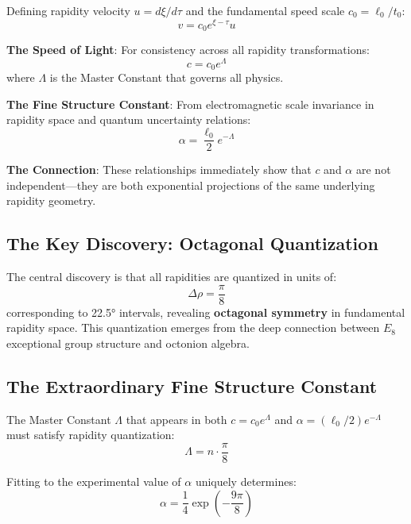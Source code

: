 \documentclass[12pt,a4paper]{article}
\begin{document}
Defining rapidity velocity $u = d\xi/d\tau$ and the fundamental speed scale $c_0 = \ell_0/t_0$:
\begin{equation}
v = c_0 e^{\xi-\tau} u
\end{equation}

\textbf{The Speed of Light}: For consistency across all rapidity transformations:
\begin{equation}
c = c_0 e^{\Lambda}
\end{equation}
where $\Lambda$ is the Master Constant that governs all physics.

\textbf{The Fine Structure Constant}: From electromagnetic scale invariance in rapidity space and quantum uncertainty relations:
\begin{equation}
\alpha = \frac{\ell_0}{2} e^{-\Lambda}
\end{equation}

\textbf{The Connection}: These relationships immediately show that $c$ and $\alpha$ are not independent—they are both exponential projections of the same underlying rapidity geometry.

\subsection{The Key Discovery: Octagonal Quantization}

The central discovery is that all rapidities are quantized in units of:
\begin{equation}
\boxed{\Delta\rho = \frac{\pi}{8}}
\end{equation}
corresponding to 22.5° intervals, revealing \textbf{octagonal symmetry} in fundamental rapidity space. This quantization emerges from the deep connection between $E_{8}$ exceptional group structure and octonion algebra.

\subsection{The Extraordinary Fine Structure Constant}

The Master Constant $\Lambda$ that appears in both $c = c_0 e^{\Lambda}$ and $\alpha = (\ell_0/2)e^{-\Lambda}$ must satisfy rapidity quantization:
\begin{equation}
\Lambda = n \cdot \frac{\pi}{8}
\end{equation}

Fitting to the experimental value of $\alpha$ uniquely determines:
\begin{equation}
\boxed{\alpha = \frac{1}{4} \exp\left(-\frac{9\pi}{8}\right)}
\end{equation}
\end{document}
